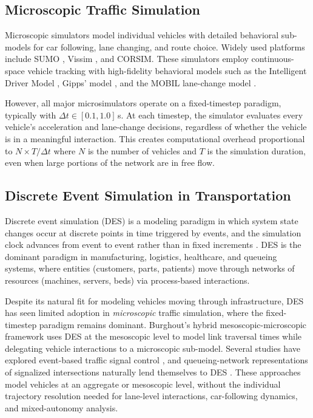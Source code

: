 \documentclass[review,number]{elsarticle}
\begin{document}
\subsection{Microscopic Traffic Simulation}
\label{sec:lit_microsim}

Microscopic simulators model individual vehicles with detailed behavioral sub-models for car following, lane changing, and route choice. Widely used platforms include SUMO \citep{lopez2018microscopic}, Vissim \citep{fellendorf2010microscopic}, and CORSIM. These simulators employ continuous-space vehicle tracking with high-fidelity behavioral models such as the Intelligent Driver Model \citep[IDM;][]{treiber2000congested}, Gipps' model \citep{gipps1981behavioural}, and the MOBIL lane-change model \citep{kesting2007general}.

However, all major microsimulators operate on a fixed-timestep paradigm, typically with $\Delta t \in [0.1, 1.0]$\,s. At each timestep, the simulator evaluates every vehicle's acceleration and lane-change decisions, regardless of whether the vehicle is in a meaningful interaction. This creates computational overhead proportional to $N \times T / \Delta t$ where $N$ is the number of vehicles and $T$ is the simulation duration, even when large portions of the network are in free flow.

\subsection{Discrete Event Simulation in Transportation}
\label{sec:lit_des}

Discrete event simulation (DES) is a modeling paradigm in which system state changes occur at discrete points in time triggered by events, and the simulation clock advances from event to event rather than in fixed increments \citep{banks2010discrete}. DES is the dominant paradigm in manufacturing, logistics, healthcare, and queueing systems, where entities (customers, parts, patients) move through networks of resources (machines, servers, beds) via process-based interactions.

Despite its natural fit for modeling vehicles moving through infrastructure, DES has seen limited adoption in \emph{microscopic} traffic simulation, where the fixed-timestep paradigm remains dominant. Burghout's hybrid mesoscopic-microscopic framework \citep{burghout2005hybrid} uses DES at the mesoscopic level to model link traversal times while delegating vehicle interactions to a microscopic sub-model. Several studies have explored event-based traffic signal control \citep{barcelo2010models}, and queueing-network representations of signalized intersections naturally lend themselves to DES \citep{osorio2013simulation}. These approaches model vehicles at an aggregate or mesoscopic level, without the individual trajectory resolution needed for lane-level interactions, car-following dynamics, and mixed-autonomy analysis.
\end{document}
